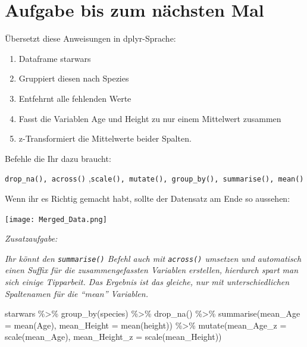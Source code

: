 \documentclass[
]{book}
\newenvironment{Shaded}{\begin{snugshade}}{\end{snugshade}}
\newcommand{\AttributeTok}[1]{\textcolor[rgb]{0.77,0.63,0.00}{#1}}
\newcommand{\FunctionTok}[1]{\textcolor[rgb]{0.00,0.00,0.00}{#1}}
\newcommand{\NormalTok}[1]{#1}
\newcommand{\SpecialCharTok}[1]{\textcolor[rgb]{0.00,0.00,0.00}{#1}}
\providecommand{\tightlist}{%
  \setlength{\itemsep}{0pt}\setlength{\parskip}{0pt}}
\theoremstyle{definition}
\theoremstyle{definition}
\theoremstyle{definition}
\theoremstyle{definition}
\theoremstyle{remark}
\begin{document}
\hypertarget{aufgabe-bis-zum-nuxe4chsten-mal}{%
\section{Aufgabe bis zum nächsten Mal}\label{aufgabe-bis-zum-nuxe4chsten-mal}}

Übersetzt diese Anweisungen in dplyr-Sprache:

\begin{enumerate}
\def\labelenumi{\arabic{enumi}.}
\tightlist
\item
  Dataframe starwars
\item
  Gruppiert diesen nach Spezies
\item
  Entfehrnt alle fehlenden Werte
\item
  Fasst die Variablen Age und Height zu nur einem Mittelwert zusammen
\item
  z-Transformiert die Mittelwerte beider Spalten.
\end{enumerate}

Befehle die Ihr dazu braucht:

\texttt{drop\_na(),\ across()} ,\texttt{scale(),\ mutate(),\ group\_by(),\ summarise(),\ mean()}

Wenn ihr es Richtig gemacht habt, sollte der Datensatz am Ende so aussehen:

\texttt{[image: Merged\_Data.png]}

\emph{Zusatzaufgabe:}

\emph{Ihr könnt den \texttt{summarise()} Befehl auch mit \texttt{across()} umsetzen und automatisch einen Suffix für die zusammengefassten Variablen erstellen, hierdurch spart man sich einige Tipparbeit. Das Ergebnis ist das gleiche, nur mit unterschiedlichen Spaltenamen für die ``mean'' Variablen.}

\begin{Shaded}
\begin{Highlighting}[]
\NormalTok{starwars }\SpecialCharTok{\%\textgreater{}\%} \FunctionTok{group\_by}\NormalTok{(species) }\SpecialCharTok{\%\textgreater{}\%}
  \FunctionTok{drop\_na}\NormalTok{() }\SpecialCharTok{\%\textgreater{}\%}
  \FunctionTok{summarise}\NormalTok{(}\AttributeTok{mean\_Age =} \FunctionTok{mean}\NormalTok{(Age),}
            \AttributeTok{mean\_Height =} \FunctionTok{mean}\NormalTok{(height)) }\SpecialCharTok{\%\textgreater{}\%}
  \FunctionTok{mutate}\NormalTok{(}\AttributeTok{mean\_Age\_z =} \FunctionTok{scale}\NormalTok{(mean\_Age),}
         \AttributeTok{mean\_Height\_z =} \FunctionTok{scale}\NormalTok{(mean\_Height))}
\end{Highlighting}
\end{Shaded}
\end{document}
